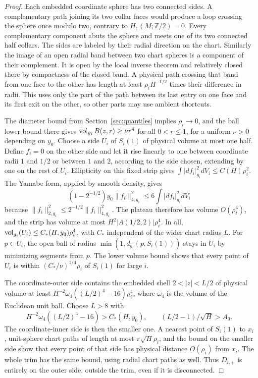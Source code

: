 \begin{proof}
Each embedded coordinate sphere has two connected sides. A
complementary path joining its two collar faces would produce
a loop crossing the sphere once modulo two, contrary to
\(H_1(M;\mathbb Z/2)=0\). Every complementary component abuts
the sphere and meets one of its two connected half collars.
The sides are labeled by their radial direction on the chart.
Similarly the image of an open radial band between two chart
spheres is a component of their complement. It is open by
the local inverse theorem and relatively closed there by
compactness of the closed band. A physical path crossing that
band from one face to the other has length at least
\(\rho_i H^{-1/2}\) times their difference in radii. This uses
only the part of the path between its last entry on one face
and its first exit on the other, so other parts may use ambient
shortcuts.

The diameter bound from Section~\ref{sec:quantiles} implies
\(\rho_i\to0\), and the ball lower bound there gives
\(\operatorname{vol}_{g_i}B(z,r)\ge\nu r^4\) for all \(0<r\le1\), for a uniform
\(\nu>0\) depending on \(y_0\). Choose a side \(U_i\) of \(S_i(1)\)
of physical volume at most one half. Define \(f_i=0\) on the
other side and let it rise linearly to one between coordinate
radii \(1\) and \(1/2\) or between \(1\) and \(2\), according to
the side chosen, extending by one on the rest of \(U_i\).
Ellipticity on this fixed strip gives
\(\int|df_i|_{g_i}^2dV_i\le C(H)\rho_i^2\). The Yamabe form,
applied by smooth density, gives
\[
 (1-2^{-1/2})y_0\|f_i\|_{4,g_i}^2
 \le 6\int|df_i|_{g_i}^2dV_i
\]
because \(\|f_i\|_{2,g_i}^2\le2^{-1/2}\|f_i\|_{4,g_i}^2\).
The plateau therefore has volume \(O(\rho_i^4)\), and the
strip has volume at most \(H^2|A(1/2,2)|\rho_i^4\). In all,
\(\operatorname{vol}_{g_i}(U_i)\le C_*(H,y_0)\rho_i^4\), with \(C_*\)
independent of the wider chart radius \(L\). For \(p\in U_i\),
the open ball of radius \(\min(1,d_{g_i}(p,S_i(1)))\) stays in
\(U_i\) by minimizing segments from \(p\). The lower volume
bound shows that every point of \(U_i\) is within
\((C_*/\nu)^{1/4}\rho_i\) of \(S_i(1)\) for large \(i\).

The coordinate-outer side contains the embedded shell
\(2<|z|<L/2\) of physical volume at least
\(H^{-2}\omega_4((L/2)^4-16)\rho_i^4\), where \(\omega_4\) is the
volume of the Euclidean unit ball. Choose \(L>8\) with
\begin{equation}\label{eq:anchored-width}
 H^{-2}\omega_4((L/2)^4-16)>C_*(H,y_0),\qquad
 (L/2-1)/\sqrt H>A_0 .
\end{equation}
The coordinate-inner side is then the smaller one. A nearest point
of \(S_i(1)\) to \(x_i\), unit-sphere chart paths of length at most
\(\pi\sqrt H\rho_i\), and the bound on the smaller side show that
every point of that side has physical distance \(O(\rho_i)\) from
\(x_i\). The whole trim has the same bound, using radial chart
paths as well. Thus \(D_{i,+}\) is entirely on the outer side,
outside the trim, even if it is disconnected.


\end{proof}
